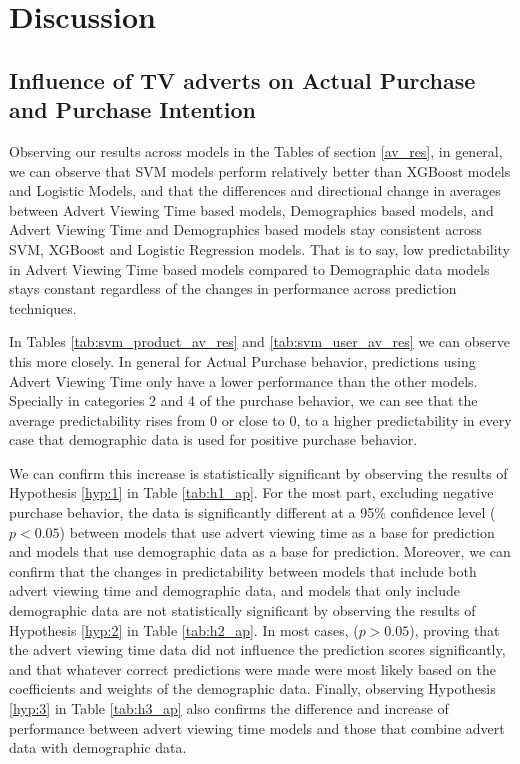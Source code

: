 \documentclass[review]{elsarticle}
\begin{document}
\section{Discussion}
\label{discussion}

\subsection{Influence of TV adverts on Actual Purchase and Purchase Intention}
\label{disc_ap_pi}

Observing our results across models in the Tables of section \ref{av_res}, in general, we can observe that SVM models perform relatively better than XGBoost models and Logistic Models, and that the differences and directional change in averages between Advert Viewing Time based models, Demographics based models, and Advert Viewing Time and Demographics based models stay consistent across SVM, XGBoost and Logistic Regression models. That is to say, low predictability in Advert Viewing Time based models compared to Demographic data models stays constant regardless of the changes in performance across prediction techniques.
  
In Tables \ref{tab:svm_product_av_res} and \ref{tab:svm_user_av_res} we can observe this more closely. In general for Actual Purchase behavior, predictions using Advert Viewing Time only have a lower performance than the other models. Specially in categories 2 and 4 of the purchase behavior, we can see that the average predictability rises from 0 or close to 0, to a higher predictability in every case that demographic data is used for positive purchase behavior.

We can confirm this increase is statistically significant by observing the results of Hypothesis \ref{hyp:1} in Table \ref{tab:h1_ap}. For the most part, excluding negative purchase behavior, the data is significantly different at a 95\% confidence level (\(p<0.05\)) between models that use advert viewing time as a base for prediction and models that use demographic data as a base for prediction. Moreover, we can confirm that the changes in predictability between models that include both advert viewing time and demographic data, and models that only include demographic data are not statistically significant by observing the results of Hypothesis \ref{hyp:2} in Table \ref{tab:h2_ap}. In most cases, (\(p>0.05\)), proving that the advert viewing time data did not influence the prediction scores significantly, and that whatever correct predictions were made were most likely based on the coefficients and weights of the demographic data. Finally, observing Hypothesis \ref{hyp:3} in Table \ref{tab:h3_ap} also confirms the difference and increase of performance between advert viewing time models and those that combine advert data with demographic data. 
\end{document}

